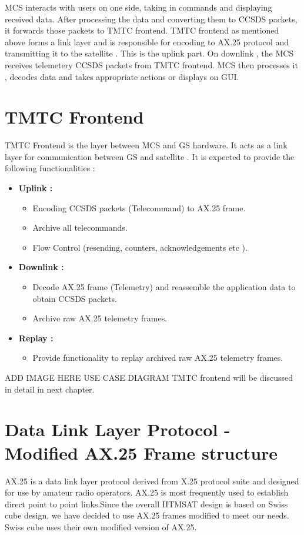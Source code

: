\documentclass[BTech]{iitmdiss}
\begin{document}
\par MCS interacts with users on one side, taking in commands and displaying received data. After processing the data and converting them to CCSDS packets, it forwards those packets to TMTC frontend. TMTC frontend as mentioned above forms a link layer and is responsible for encoding to AX.25 protocol and transmitting it to the satellite . This is the uplink part. On downlink , the MCS receives telemetery CCSDS packets from TMTC frontend. MCS then processes it , decodes data and takes appropriate actions or displays on GUI.

\section{TMTC Frontend}
TMTC Frontend is the layer between MCS and GS hardware. It acts as a link layer for communication between GS and satellite . It is expected to provide the following functionalities :
\begin{itemize}
\item \textbf{Uplink : } 
\begin{itemize}
\item Encoding CCSDS packets (Telecommand) to AX.25 frame.
\item Archive all telecommands.
\item Flow Control (resending, counters, acknowledgements etc ).

\end{itemize}
\item \textbf{Downlink : }
\begin{itemize}
\item Decode AX.25 frame (Telemetry) and reassemble the application data to obtain CCSDS packets.
\item Archive raw AX.25  telemetry frames. 

\end{itemize}
\item \textbf{Replay : }
\begin{itemize}
\item Provide functionality to replay archived raw AX.25 telemetry frames.
\end{itemize}
\end{itemize}
ADD IMAGE HERE USE CASE DIAGRAM
\linebreak TMTC frontend will be discussed in detail in next chapter.

\section{Data Link Layer Protocol -  \\ Modified AX.25 Frame structure }
AX.25 is a data link layer protocol derived from X.25 protocol suite and designed for use by amateur radio operators. AX.25 is most frequently used to establish direct point to point links.Since the overall IITMSAT design is based on Swiss cube design, we have decided to use AX.25 frames modified to meet our needs. Swiss cube uses their own modified version of AX.25. 
\end{document}
